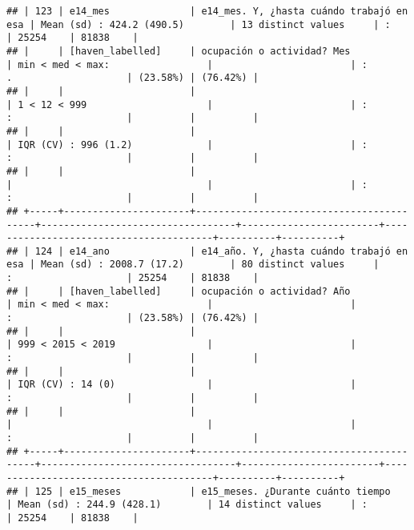 \documentclass[]{article}
\begin{document}
\begin{verbatim}
## | 123 | e14_mes              | e14_mes. Y, ¿hasta cuándo trabajó en esa | Mean (sd) : 424.2 (490.5)        | 13 distinct values     | :                                      | 25254    | 81838    |
## |     | [haven_labelled]     | ocupación o actividad? Mes               | min < med < max:                 |                        | :                 .                    | (23.58%) | (76.42%) |
## |     |                      |                                          | 1 < 12 < 999                     |                        | :                 :                    |          |          |
## |     |                      |                                          | IQR (CV) : 996 (1.2)             |                        | :                 :                    |          |          |
## |     |                      |                                          |                                  |                        | :                 :                    |          |          |
## +-----+----------------------+------------------------------------------+----------------------------------+------------------------+----------------------------------------+----------+----------+
## | 124 | e14_ano              | e14_año. Y, ¿hasta cuándo trabajó en esa | Mean (sd) : 2008.7 (17.2)        | 80 distinct values     |                   :                    | 25254    | 81838    |
## |     | [haven_labelled]     | ocupación o actividad? Año               | min < med < max:                 |                        |                   :                    | (23.58%) | (76.42%) |
## |     |                      |                                          | 999 < 2015 < 2019                |                        |                   :                    |          |          |
## |     |                      |                                          | IQR (CV) : 14 (0)                |                        |                   :                    |          |          |
## |     |                      |                                          |                                  |                        |                   :                    |          |          |
## +-----+----------------------+------------------------------------------+----------------------------------+------------------------+----------------------------------------+----------+----------+
## | 125 | e15_meses            | e15_meses. ¿Durante cuánto tiempo        | Mean (sd) : 244.9 (428.1)        | 14 distinct values     | :                                      | 25254    | 81838    |

\end{verbatim}
\end{document}

